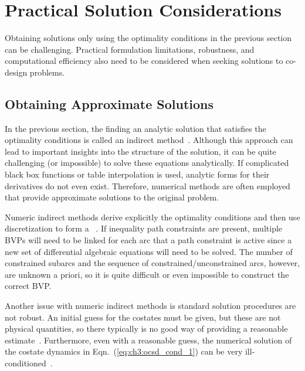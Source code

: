 \section{Practical Solution Considerations \label{sec:ch3:numerical}}

Obtaining solutions only using the optimality conditions in the previous section can be challenging. Practical formulation limitations, robustness, and computational efficiency also need to be considered when seeking solutions to co-design problems.

\subsection{Obtaining Approximate Solutions \label{sec:ch3:approx}}

In the previous section,  the finding an analytic solution that satisfies the optimality conditions is called an indirect method~\cite{Betts2010a, Biegler2010a}. Although this approach can lead to important insights into the structure of the solution, it can be quite challenging (or impossible) to solve these equations analytically.
If complicated black box functions or table interpolation is used, analytic forms for their derivatives do not even exist.
Therefore, numerical methods are often employed that provide approximate solutions to the original problem.

Numeric indirect methods derive explicitly the optimality conditions and then use discretization to form a ~\cite{Biegler2010a}.
If inequality path constraints are present, multiple BVPs will need to be linked for each arc that a path constraint is active since a new set of differential algebraic equations will need to be solved. 
The number of constrained subarcs and the sequence of constrained/unconstrained arcs, however, are unknown a priori, so it is quite difficult or even impossible to construct the correct BVP.

Another issue with numeric indirect methods is standard solution procedures are not robust.
An initial guess for the costates must be given, but these are not physical quantities, so there typically is no good way of providing a reasonable estimate~\cite{Betts2010a}.
Furthermore, even with a reasonable guess, the numerical solution of the costate dynamics in Eqn.~(\ref{eq:ch3:ocsd_cond_1}) can be very ill-conditioned~\cite{Bryson1975a}.

